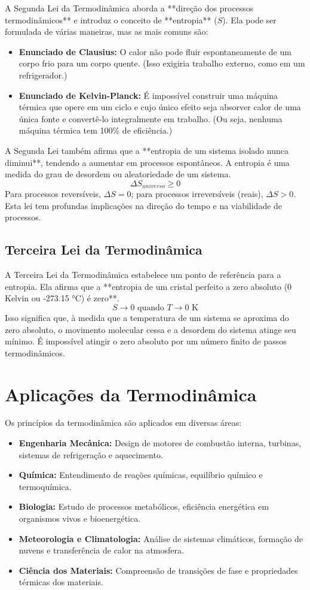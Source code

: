 \documentclass{article}
\begin{document}
A Segunda Lei da Termodinâmica aborda a **direção dos processos termodinâmicos** e introduz o conceito de **entropia** ($S$). Ela pode ser formulada de várias maneiras, mas as mais comuns são:
\begin{itemize}
    \item \textbf{Enunciado de Clausius:} O calor não pode fluir espontaneamente de um corpo frio para um corpo quente. (Isso exigiria trabalho externo, como em um refrigerador.)
    \item \textbf{Enunciado de Kelvin-Planck:} É impossível construir uma máquina térmica que opere em um ciclo e cujo único efeito seja absorver calor de uma única fonte e convertê-lo integralmente em trabalho. (Ou seja, nenhuma máquina térmica tem 100\% de eficiência.)
\end{itemize}
A Segunda Lei também afirma que a **entropia de um sistema isolado nunca diminui**, tendendo a aumentar em processos espontâneos. A entropia é uma medida do grau de desordem ou aleatoriedade de um sistema.
$$ \Delta S_{universo} \ge 0 $$
Para processos reversíveis, $\Delta S = 0$; para processos irreversíveis (reais), $\Delta S > 0$. Esta lei tem profundas implicações na direção do tempo e na viabilidade de processos.

\subsection{Terceira Lei da Termodinâmica}

A Terceira Lei da Termodinâmica estabelece um ponto de referência para a entropia. Ela afirma que a **entropia de um cristal perfeito a zero absoluto (0 Kelvin ou -273.15 °C) é zero**.
$$ S \to 0 \text{ quando } T \to 0 \text{ K} $$
Isso significa que, à medida que a temperatura de um sistema se aproxima do zero absoluto, o movimento molecular cessa e a desordem do sistema atinge seu mínimo. É impossível atingir o zero absoluto por um número finito de passos termodinâmicos.

\section{Aplicações da Termodinâmica}

Os princípios da termodinâmica são aplicados em diversas áreas:
\begin{itemize}
    \item \textbf{Engenharia Mecânica:} Design de motores de combustão interna, turbinas, sistemas de refrigeração e aquecimento.
    \item \textbf{Química:} Entendimento de reações químicas, equilíbrio químico e termoquímica.
    \item \textbf{Biologia:} Estudo de processos metabólicos, eficiência energética em organismos vivos e bioenergética.
    \item \textbf{Meteorologia e Climatologia:} Análise de sistemas climáticos, formação de nuvens e transferência de calor na atmosfera.
    \item \textbf{Ciência dos Materiais:} Compreensão de transições de fase e propriedades térmicas dos materiais.
\end{itemize}
\end{document}

